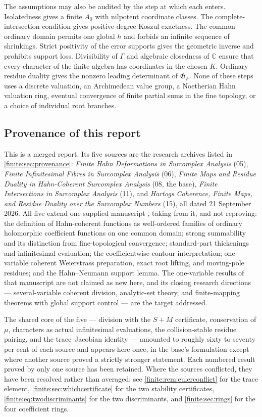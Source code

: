 \documentclass[11pt,letterpaper]{article}
\theoremstyle{definition}
\theoremstyle{remark}
\newcommand{\C}{\mathbb C}
\newcommand{\Gram}{\mathfrak G}
\numberwithin{equation}{section}
\begin{document}
The assumptions may also be audited by the step at which each enters. Isolatedness gives a finite $A_0$ with nilpotent coordinate classes. The complete-intersection condition gives positive-degree Koszul exactness. The common ordinary domain permits one global $h$ and forbids an infinite sequence of shrinkings. Strict positivity of the error supports gives the geometric inverse and prohibits support loss. Divisibility of $\Gamma$ and algebraic closedness of $\C$ ensure that every character of the finite algebra has coordinates in the chosen $K$. Ordinary residue duality gives the nonzero leading determinant of $\Gram_F$. None of these steps uses a discrete valuation, an Archimedean value group, a Noetherian Hahn valuation ring, eventual convergence of finite partial sums in the fine topology, or a choice of individual root branches.

\subsection{Provenance of this report}

This is a merged report. Its five sources are the research archives listed in \cref{finite:sec:provenance}: \emph{Finite Hahn Deformations in Surcomplex Analysis} (05), \emph{Finite Infinitesimal Fibres in Surcomplex Analysis} (06), \emph{Finite Maps and Residue Duality in Hahn-Coherent Surcomplex Analysis} (08, the base), \emph{Finite Intersections in Surcomplex Analysis} (11), and \emph{Hartogs Coherence, Finite Maps, and Residue Duality over the Surcomplex Numbers} (15), all dated 21 September 2026. All five extend one supplied manuscript \cite{finite:Supplied}, taking from it, and not reproving: the definition of Hahn-coherent functions as well-ordered families of ordinary holomorphic coefficient functions on one common domain; strong summability and its distinction from fine-topological convergence; standard-part thickenings and infinitesimal evaluation; the coefficientwise contour interpretation; one-variable coherent Weierstrass preparation, exact root lifting, and moving-pole residues; and the Hahn--Neumann support lemma. The one-variable results of that manuscript are not claimed as new here, and its closing research directions --- several-variable coherent division, analytic-set theory, and finite-mapping theorems with global support control --- are the target addressed.

The shared core of the five --- division with the $S+M$ certificate, conservation of $\mu$, characters as actual infinitesimal evaluations, the collision-stable residue pairing, and the trace--Jacobian identity --- amounted to roughly sixty to seventy per cent of each source and appears here once, in the base's formulation except where another source proved a strictly stronger statement. Each numbered result proved by only one source has been retained. Where the sources conflicted, they have been resolved rather than averaged: see \cref{finite:rem:eulerconflict} for the trace element, \cref{finite:sec:whichcertificate} for the two stability certificates, \eqref{finite:eq:twodiscriminants} for the two discriminants, and \cref{finite:sec:rings} for the four coefficient rings.
\end{document}
